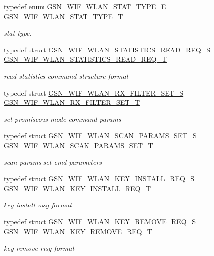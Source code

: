 \begin{DoxyCompactItemize}
typedef enum \hyperlink{a00677_ga1ea7ef2124a3ae886d909d6b8188ef79}{GSN\_\-WIF\_\-WLAN\_\-STAT\_\-TYPE\_\-E} \hyperlink{a00677_ga64d9749befbab903d13eae1c816e40cf}{GSN\_\-WIF\_\-WLAN\_\-STAT\_\-TYPE\_\-T}
\begin{DoxyCompactList}\small\item\em stat type. \end{DoxyCompactList}\item 
typedef struct \hyperlink{a00406}{GSN\_\-WIF\_\-WLAN\_\-STATISTICS\_\-READ\_\-REQ\_\-S} \hyperlink{a00677_ga0532c6cda31388631d8d6346390ac764}{GSN\_\-WIF\_\-WLAN\_\-STATISTICS\_\-READ\_\-REQ\_\-T}
\begin{DoxyCompactList}\small\item\em read statistics command structure format \end{DoxyCompactList}\item 
typedef struct \hyperlink{a00397}{GSN\_\-WIF\_\-WLAN\_\-RX\_\-FILTER\_\-SET\_\-S} \hyperlink{a00677_gad632a83292610148499e14031b507f4b}{GSN\_\-WIF\_\-WLAN\_\-RX\_\-FILTER\_\-SET\_\-T}
\begin{DoxyCompactList}\small\item\em set promiscous mode command params \end{DoxyCompactList}\item 
typedef struct \hyperlink{a00401}{GSN\_\-WIF\_\-WLAN\_\-SCAN\_\-PARAMS\_\-SET\_\-S} \hyperlink{a00677_ga38fb363f219070729c31798116e9702c}{GSN\_\-WIF\_\-WLAN\_\-SCAN\_\-PARAMS\_\-SET\_\-T}
\begin{DoxyCompactList}\small\item\em scan params set cmd parameters \end{DoxyCompactList}\item 
typedef struct \hyperlink{a00386}{GSN\_\-WIF\_\-WLAN\_\-KEY\_\-INSTALL\_\-REQ\_\-S} \hyperlink{a00677_gaf02b17f4ae1181f48eafc5cafc75a98b}{GSN\_\-WIF\_\-WLAN\_\-KEY\_\-INSTALL\_\-REQ\_\-T}
\begin{DoxyCompactList}\small\item\em key install msg format \end{DoxyCompactList}\item 
typedef struct \hyperlink{a00387}{GSN\_\-WIF\_\-WLAN\_\-KEY\_\-REMOVE\_\-REQ\_\-S} \hyperlink{a00677_gab7781e4db5d81b8372ab59ea540b6f04}{GSN\_\-WIF\_\-WLAN\_\-KEY\_\-REMOVE\_\-REQ\_\-T}
\begin{DoxyCompactList}\small\item\em key remove msg format \end{DoxyCompactList}\item 

\end{DoxyCompactItemize}
